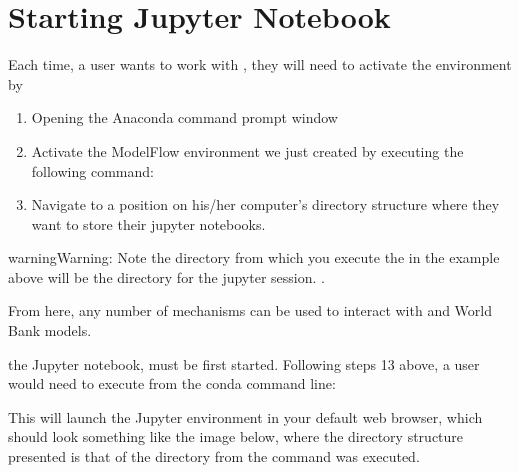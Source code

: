 \documentclass[letterpaper,10pt,english]{jupyterBook}
\begin{document}
\section{Starting Jupyter Notebook}
\label{\detokenize{content/04_PythonEssentials/Intro_Jupyter_notebook:starting-jupyter-notebook}}
\sphinxAtStartPar
Each time, a user wants to work with , they will need to activate the  environment by
\begin{enumerate}
%
\item {} 
\sphinxAtStartPar
Opening the Anaconda command prompt window

\item {} 
\sphinxAtStartPar
Activate the ModelFlow environment we just created by executing the following command: 

\item {} 
\sphinxAtStartPar
Navigate to a position on his/her computer’s directory structure where they want to store their jupyter notebooks.

\end{enumerate}

\begin{sphinxadmonition}{warning}{Warning:}
\sphinxAtStartPar
Note the directory from which you execute the   in the example above will be the  directory for the jupyter session.  .
\end{sphinxadmonition}

\sphinxAtStartPar
From here, any number of mechanisms can be used to interact with  and World Bank models.

\sphinxAtStartPar
{} the Jupyter notebook, must be first started.  Following steps 1\sphinxhyphen{}3 above, a user would need to execute from the conda command line:

\sphinxAtStartPar
{}

\sphinxAtStartPar
This will launch the Jupyter environment in your default web browser, which should look something like the image below, where the directory structure presented is that of the directory from the  command was executed.
\end{document}
